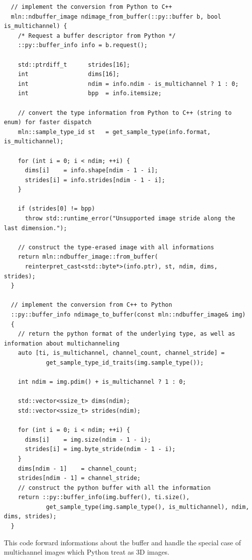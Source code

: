 \begin{verbatim}
  // implement the conversion from Python to C++
  mln::ndbuffer_image ndimage_from_buffer(::py::buffer b, bool is_multichannel) {
    /* Request a buffer descriptor from Python */
    ::py::buffer_info info = b.request();

    std::ptrdiff_t      strides[16];
    int                 dims[16];
    int                 ndim = info.ndim - is_multichannel ? 1 : 0;
    int                 bpp  = info.itemsize;

    // convert the type information from Python to C++ (string to enum) for faster dispatch
    mln::sample_type_id st   = get_sample_type(info.format, is_multichannel);

    for (int i = 0; i < ndim; ++i) {
      dims[i]    = info.shape[ndim - 1 - i];
      strides[i] = info.strides[ndim - 1 - i];
    }

    if (strides[0] != bpp)
      throw std::runtime_error("Unsupported image stride along the last dimension.");

    // construct the type-erased image with all informations
    return mln::ndbuffer_image::from_buffer(
      reinterpret_cast<std::byte*>(info.ptr), st, ndim, dims, strides);
  }

  // implement the conversion from C++ to Python
  ::py::buffer_info ndimage_to_buffer(const mln::ndbuffer_image& img)
  {
    // return the python format of the underlying type, as well as information about multichanneling
    auto [ti, is_multichannel, channel_count, channel_stride] =
            get_sample_type_id_traits(img.sample_type());

    int ndim = img.pdim() + is_multichannel ? 1 : 0;

    std::vector<ssize_t> dims(ndim);
    std::vector<ssize_t> strides(ndim);

    for (int i = 0; i < ndim; ++i) {
      dims[i]    = img.size(ndim - 1 - i);
      strides[i] = img.byte_stride(ndim - 1 - i);
    }
    dims[ndim - 1]    = channel_count;
    strides[ndim - 1] = channel_stride;
    // construct the python buffer with all the information
    return ::py::buffer_info(img.buffer(), ti.size(),
            get_sample_type(img.sample_type(), is_multichannel), ndim, dims, strides);
  }
\end{verbatim}

This code forward informations about the buffer and handle the special case of multichannel images which Python treat
as 3D images.



